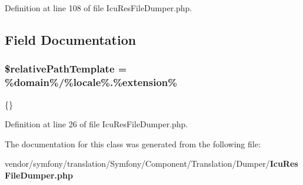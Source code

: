 Definition at line 108 of file Icu\+Res\+File\+Dumper.\+php.



\subsection{Field Documentation}
\subsubsection[{\$relative\+Path\+Template}]{\setlength{\rightskip}{0pt plus 5cm}\$relative\+Path\+Template = \textquotesingle{}\%domain\%/\%{\bf locale}\%.\%extension\%\textquotesingle{}\hspace{0.3cm}{\ttfamily [protected]}}\label{class_symfony_1_1_component_1_1_translation_1_1_dumper_1_1_icu_res_file_dumper_adc62ef9e4326694351f67d71dc4b5853}
\{\} 

Definition at line 26 of file Icu\+Res\+File\+Dumper.\+php.



The documentation for this class was generated from the following file\+:\begin{DoxyCompactItemize}
\item 
vendor/symfony/translation/\+Symfony/\+Component/\+Translation/\+Dumper/{\bf Icu\+Res\+File\+Dumper.\+php}\end{DoxyCompactItemize}
